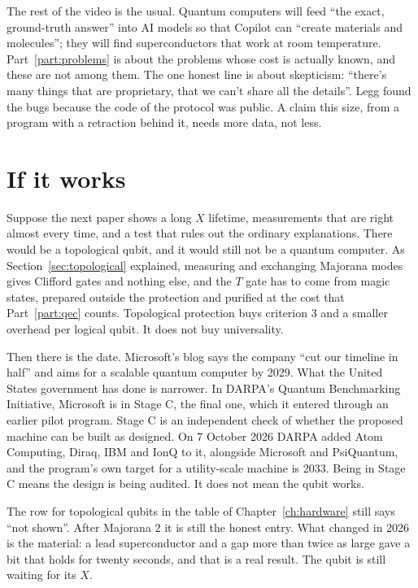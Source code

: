 The rest of the video is the usual. Quantum computers will feed ``the exact, ground-truth
answer'' into AI models so that Copilot can ``create materials and molecules''; they will find
superconductors that work at room temperature. Part~\ref{part:problems} is about the problems
whose cost is actually known, and these are not among them. The one honest line is about
skepticism: ``there's many things that are proprietary, that we can't share all the details''.
Legg found the bugs because the code of the protocol was public. A claim this size, from a
program with a retraction behind it, needs more data, not less.

\section{If it works}

Suppose the next paper shows a long $X$ lifetime, measurements that are right almost every time,
and a test that rules out the ordinary explanations. There would be a topological qubit, and it
would still not be a quantum computer. As Section~\ref{sec:topological} explained, measuring and
exchanging Majorana modes gives Clifford gates and nothing else, and the $T$ gate has to come from
magic states, prepared outside the protection and purified at the cost that Part~\ref{part:qec}
counts. Topological protection buys criterion 3 and a smaller overhead per logical qubit. It does
not buy universality.

Then there is the date. Microsoft's blog says the company ``cut our timeline in half'' and aims for
a scalable quantum computer by 2029. What the United States government has done is narrower. In
DARPA's Quantum Benchmarking Initiative, Microsoft is in Stage C, the final one, which it entered
through an earlier pilot program. Stage C is an independent check of whether the proposed machine
can be built as designed. On 7 October 2026 DARPA added Atom Computing, Diraq, IBM and IonQ to it,
alongside Microsoft and PsiQuantum, and the program's own target for a utility-scale machine is
2033. Being in Stage C means the design is being audited. It does not mean the qubit works.

The row for topological qubits in the table of Chapter~\ref{ch:hardware} still says ``not shown''.
After Majorana 2 it is still the honest entry. What changed in 2026 is the material: a lead
superconductor and a gap more than twice as large gave a bit that holds for twenty seconds, and
that is a real result. The qubit is still waiting for its $X$.
